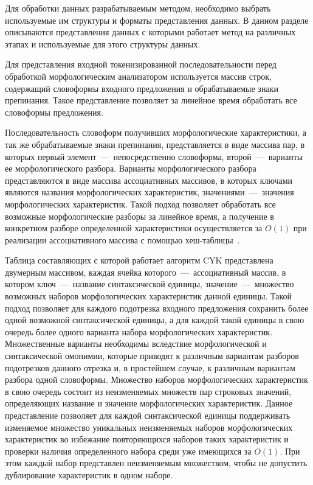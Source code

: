 Для обработки данных разрабатываемым методом, необходимо выбрать используемые им структуры и форматы представления данных. В данном разделе описываются представления данных с которыми работает метод на различных этапах и используемые для этого структуры данных.

Для представления входной токенизированной последовательности перед обработкой морфологическим анализатором используется массив строк, содержащий словоформы входного предложения и обрабатываемые знаки препинания. Такое представление позволяет за линейное время обработать все словоформы предложения.

Последовательность словоформ получивших морфологические характеристики, а так же обрабатываемые знаки препинания, представляется в виде массива пар, в которых первый элемент~---~непосредственно словоформа, второй~---~варианты ее морфологического разбора. Варианты морфологического разбора представляются в виде массива ассоциативных массивов, в которых ключами являются названия морфологических характеристик, значениями~---~значения морфологических характеристик. Такой подход позволяет обработать все возможные морфологические разборы за линейное время, а получение в конкретном разборе определенной характеристики осуществляется за $O(1)$ при реализации ассоциативного массива с помощью хеш-таблицы~\cite{cormen13}.

Таблица составляющих с которой работает алгоритм CYK представлена двумерным массивом, каждая ячейка которого~---~ассоциативный массив, в котором ключ~---~название синтаксической единицы, значение~---~множество возможных наборов морфологических характеристик данной единицы. Такой подход позволяет для каждого подотрезка входного предложения сохранить более одной возможной синтаксической единицы, а для каждой такой единицы в свою очередь более одного варианта набора морфологических характеристик. Множественные варианты необходимы вследствие морфологической и синтаксической омонимии, которые приводят к различным вариантам разборов подотрезков данного отрезка и, в простейшем случае, к различным вариантам разбора одной словоформы. Множество наборов морфологических характеристик в свою очередь состоит из неизменяемых множеств пар строковых значений, определяющих название и значение морфологических характеристик. Данное представление позволяет для каждой синтаксической единицы поддерживать изменяемое множество уникальных неизменяемых наборов морфологических характеристик во избежание повторяющихся наборов таких характеристик и проверки наличия определенного набора среди уже имеющихся за $O(1)$. При этом каждый набор представлен неизменяемым множеством, чтобы не допустить дублирование характеристик в одном наборе.

